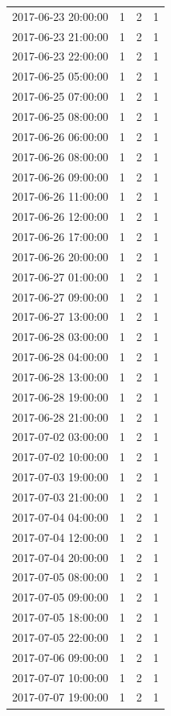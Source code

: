 \begin{tabular}{lrrr}
2017-06-23 20:00:00 & 1 & 2 & 1 \\
2017-06-23 21:00:00 & 1 & 2 & 1 \\
2017-06-23 22:00:00 & 1 & 2 & 1 \\
2017-06-25 05:00:00 & 1 & 2 & 1 \\
2017-06-25 07:00:00 & 1 & 2 & 1 \\
2017-06-25 08:00:00 & 1 & 2 & 1 \\
2017-06-26 06:00:00 & 1 & 2 & 1 \\
2017-06-26 08:00:00 & 1 & 2 & 1 \\
2017-06-26 09:00:00 & 1 & 2 & 1 \\
2017-06-26 11:00:00 & 1 & 2 & 1 \\
2017-06-26 12:00:00 & 1 & 2 & 1 \\
2017-06-26 17:00:00 & 1 & 2 & 1 \\
2017-06-26 20:00:00 & 1 & 2 & 1 \\
2017-06-27 01:00:00 & 1 & 2 & 1 \\
2017-06-27 09:00:00 & 1 & 2 & 1 \\
2017-06-27 13:00:00 & 1 & 2 & 1 \\
2017-06-28 03:00:00 & 1 & 2 & 1 \\
2017-06-28 04:00:00 & 1 & 2 & 1 \\
2017-06-28 13:00:00 & 1 & 2 & 1 \\
2017-06-28 19:00:00 & 1 & 2 & 1 \\
2017-06-28 21:00:00 & 1 & 2 & 1 \\
2017-07-02 03:00:00 & 1 & 2 & 1 \\
2017-07-02 10:00:00 & 1 & 2 & 1 \\
2017-07-03 19:00:00 & 1 & 2 & 1 \\
2017-07-03 21:00:00 & 1 & 2 & 1 \\
2017-07-04 04:00:00 & 1 & 2 & 1 \\
2017-07-04 12:00:00 & 1 & 2 & 1 \\
2017-07-04 20:00:00 & 1 & 2 & 1 \\
2017-07-05 08:00:00 & 1 & 2 & 1 \\
2017-07-05 09:00:00 & 1 & 2 & 1 \\
2017-07-05 18:00:00 & 1 & 2 & 1 \\
2017-07-05 22:00:00 & 1 & 2 & 1 \\
2017-07-06 09:00:00 & 1 & 2 & 1 \\
2017-07-07 10:00:00 & 1 & 2 & 1 \\
2017-07-07 19:00:00 & 1 & 2 & 1 \\

\end{tabular}
